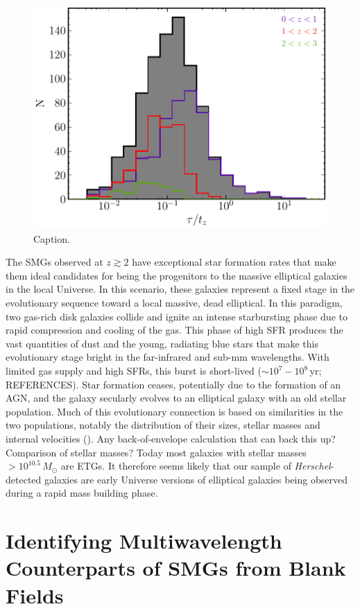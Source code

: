 \begin{figure}
	\centering
	\includegraphics[width=0.75\columnwidth]{Figures/tau_against_age.pdf}
	\caption{{\color{red} Caption.}}
	\label{fig:tau_against_age}
\end{figure}

The SMGs observed at $z\gtrsim2$ have exceptional star formation rates that make them ideal candidates for being the progenitors to the massive elliptical galaxies in the local Universe. In this scenario, these galaxies represent a fixed stage in the evolutionary sequence toward a local massive, dead elliptical. In this paradigm, two gas-rich disk galaxies collide and ignite an intense starbursting phase due to rapid compression and cooling of the gas. This phase of high SFR produces the vast quantities of dust and the young, radiating blue stars that make this evolutionary stage bright in the far-infrared and sub-mm wavelengths. With limited gas supply and high SFRs, this burst is short-lived ($\sim 10^7 - 10^8\,$yr; {\color{red}REFERENCES}). Star formation ceases, potentially due to the formation of an AGN, and the galaxy secularly evolves to an elliptical galaxy with an old stellar population. Much of this evolutionary connection is based on similarities in the two populations, notably the distribution of their sizes, stellar masses and internal velocities (\citealt{Toft_2014}). {\color{red}Any back-of-envelope calculation that can back this up? Comparison of stellar masses? Today most galaxies with stellar masses $>10^{10.5}\,M_\odot$ are ETGs.} It therefore seems likely that our sample of \textit{Herschel}-detected galaxies are early Universe versions of elliptical galaxies being observed during a rapid mass building phase.

\section{Identifying Multiwavelength Counterparts of SMGs from Blank Fields}

